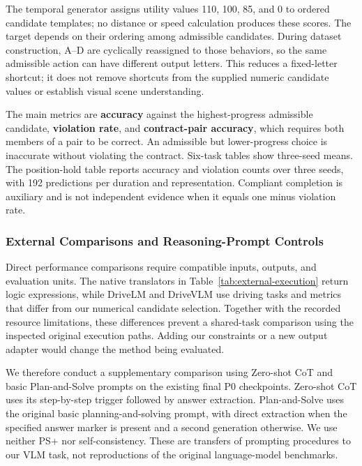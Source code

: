 \documentclass[nolineno]{ieeeaccess}
\begin{document}
The temporal generator assigns utility values 110, 100, 85, and 0 to ordered candidate templates; no distance or speed calculation produces these scores. The target depends on their ordering among admissible candidates. During dataset construction, A--D are cyclically reassigned to those behaviors, so the same admissible action can have different output letters. This reduces a fixed-letter shortcut; it does not remove shortcuts from the supplied numeric candidate values or establish visual scene understanding.\par

The main metrics are \textbf{accuracy} against the highest-progress admissible candidate, \textbf{violation rate}, and \textbf{contract-pair accuracy}, which requires both members of a pair to be correct. An admissible but lower-progress choice is inaccurate without violating the contract. Six-task tables show three-seed means. The position-hold table reports accuracy and violation counts over three seeds, with 192 predictions per duration and representation. Compliant completion is auxiliary and is not independent evidence when it equals one minus violation rate.\par

\subsubsection{External Comparisons and Reasoning-Prompt Controls}\label{sec:reasoning-controls}

Direct performance comparisons require compatible inputs, outputs, and evaluation units. The native translators in Table~\ref{tab:external-execution} return logic expressions, while DriveLM and DriveVLM use driving tasks and metrics that differ from our numerical candidate selection. Together with the recorded resource limitations, these differences prevent a shared-task comparison using the inspected original execution paths. Adding our constraints or a new output adapter would change the method being evaluated.\par

We therefore conduct a supplementary comparison using Zero-shot CoT and basic Plan-and-Solve prompts on the existing final P0 checkpoints. Zero-shot CoT uses its step-by-step trigger followed by answer extraction. Plan-and-Solve uses the original basic planning-and-solving prompt, with direct extraction when the specified answer marker is present and a second generation otherwise. We use neither PS+ nor self-consistency. These are transfers of prompting procedures to our VLM task, not reproductions of the original language-model benchmarks. \cite{r16,r17}\par
\end{document}
